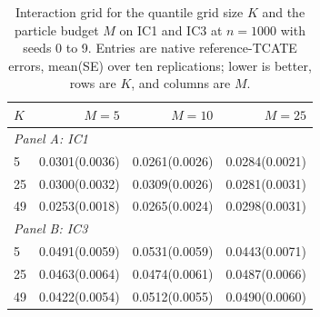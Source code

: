\begin{table}[t]
\centering
\scriptsize
\setlength{\tabcolsep}{3pt}
\caption{Interaction grid for the quantile grid size $K$ and the particle budget $M$ on IC1 and IC3 at $n=1000$ with seeds 0 to 9. Entries are native reference-TCATE errors, mean(SE) over ten replications; lower is better, rows are $K$, and columns are $M$.}
\label{tab:sensitivity-factorial}
\begin{tabular}{lrrr}
\toprule
$K$ & $M=5$ & $M=10$ & $M=25$ \\
\midrule
\multicolumn{4}{l}{\textit{Panel A: IC1}} \\
\midrule
5 & 0.0301(0.0036) & 0.0261(0.0026) & 0.0284(0.0021) \\
25 & 0.0300(0.0032) & 0.0309(0.0026) & 0.0281(0.0031) \\
49 & 0.0253(0.0018) & 0.0265(0.0024) & 0.0298(0.0031) \\
\multicolumn{4}{l}{\textit{Panel B: IC3}} \\
\midrule
5 & 0.0491(0.0059) & 0.0531(0.0059) & 0.0443(0.0071) \\
25 & 0.0463(0.0064) & 0.0474(0.0061) & 0.0487(0.0066) \\
49 & 0.0422(0.0054) & 0.0512(0.0055) & 0.0490(0.0060) \\
\bottomrule
\end{tabular}
\end{table}
